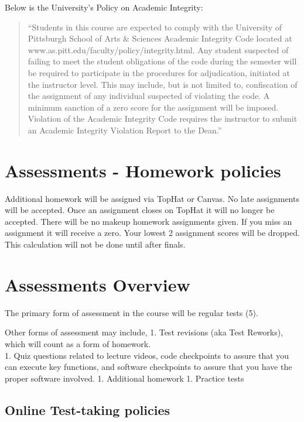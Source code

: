 \documentclass[
]{book}
\begin{document}
Below is the University's Policy on Academic Integrity:

\begin{quote}
``Students in this course are expected to comply with the University of Pittsburgh School of Arts \& Sciences Academic Integrity Code located at www.as.pitt.edu/faculty/policy/integrity.html. Any student suspected of failing to meet the student obligations of the code during the semester will be required to participate in the procedures for adjudication, initiated at the instructor level. This may include, but is not limited to, confiscation of the assignment of any individual suspected of violating the code. A minimum sanction of a zero score for the assignment will be imposed. Violation of the Academic Integrity Code requires the instructor to submit an Academic Integrity Violation Report to the Dean.''
\end{quote}

\hypertarget{assessments---homework-policies}{%
\chapter{Assessments - Homework policies}\label{assessments---homework-policies}}

Additional homework will be assigned via TopHat or Canvas. No late assignments will be accepted. Once an assignment closes on TopHat it will no longer be accepted. There will be no makeup homework assignments given. If you miss an assignment it will receive a zero. Your lowest 2 assignment scores will be dropped. This calculation will not be done until after finals.

\hypertarget{assessments}{%
\chapter{Assessments Overview}\label{assessments}}

The primary form of assessment in the course will be regular tests (5).

Other forms of assessment may include,
1. Test revisions (aka Test Reworks), which will count as a form of homework.\\
1. Quiz questions related to lecture videos, code checkpoints to assure that you can execute key functions, and software checkpoints to assure that you have the proper software involved.
1. Additional homework
1. Practice tests

\hypertarget{online-test-taking-policies}{%
\section{Online Test-taking policies}\label{online-test-taking-policies}}
\end{document}
